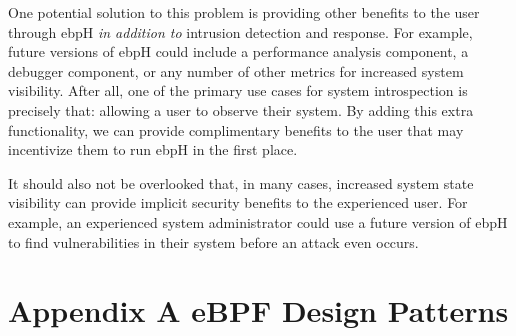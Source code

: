 \documentclass[
  12pt]{findlay}
\begin{document}
One potential solution to this problem is providing other benefits to
the user through ebpH \emph{in addition to} intrusion detection and
response. For example, future versions of ebpH could include a
performance analysis component, a debugger component, or any number of
other metrics for increased system visibility. After all, one of the
primary use cases for system introspection is precisely that: allowing a
user to observe their system. By adding this extra functionality, we can
provide complimentary benefits to the user that may incentivize them to
run ebpH in the first place.

It should also not be overlooked that, in many cases, increased system
state visibility can provide implicit security benefits to the
experienced user. For example, an experienced system administrator could
use a future version of ebpH to find vulnerabilities in their system
before an attack even occurs.

\clearpage
{}
\printbibliography
\renewcommand{\printbibliography}{\relax}
\clearpage

\hypertarget{appendix-a-ebpf-design-patterns}{%
\section*{Appendix A eBPF Design
Patterns}\label{appendix-a-ebpf-design-patterns}}

\label{ebpf-design-patterns}


\FloatBarrier

\printbibliography
\end{document}
